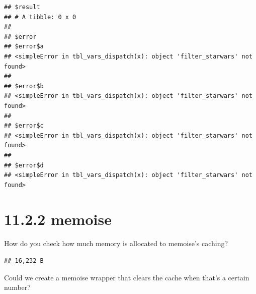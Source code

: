 \documentclass[]{book}
\newenvironment{Shaded}{\begin{snugshade}}{\end{snugshade}}
\newcommand{\ControlFlowTok}[1]{\textcolor[rgb]{0.13,0.29,0.53}{\textbf{#1}}}
\newcommand{\DecValTok}[1]{\textcolor[rgb]{0.00,0.00,0.81}{#1}}
\newcommand{\KeywordTok}[1]{\textcolor[rgb]{0.13,0.29,0.53}{\textbf{#1}}}
\newcommand{\NormalTok}[1]{#1}
\newcommand{\OperatorTok}[1]{\textcolor[rgb]{0.81,0.36,0.00}{\textbf{#1}}}
\newcommand{\StringTok}[1]{\textcolor[rgb]{0.31,0.60,0.02}{#1}}
\begin{document}
\begin{verbatim}
## $result
## # A tibble: 0 x 0
## 
## $error
## $error$a
## <simpleError in tbl_vars_dispatch(x): object 'filter_starwars' not found>
## 
## $error$b
## <simpleError in tbl_vars_dispatch(x): object 'filter_starwars' not found>
## 
## $error$c
## <simpleError in tbl_vars_dispatch(x): object 'filter_starwars' not found>
## 
## $error$d
## <simpleError in tbl_vars_dispatch(x): object 'filter_starwars' not found>
\end{verbatim}

\hypertarget{memoise}{%
\section*{11.2.2 memoise}\label{memoise}}

How do you check how much memory is allocated to memoise's caching?

\begin{Shaded}
\end{Shaded}

\begin{verbatim}
## 16,232 B
\end{verbatim}

Could we create a memoise wrapper that clears the cache when that's a certain number?
\end{document}
